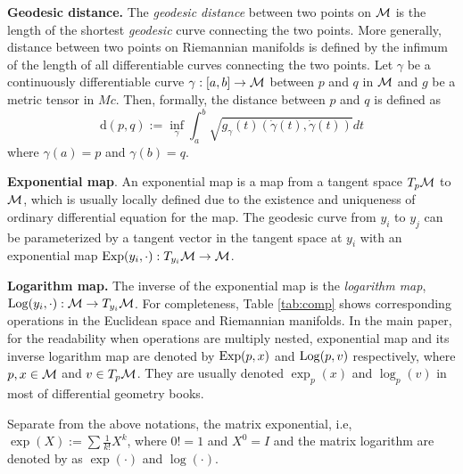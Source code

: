 \textbf{Geodesic distance.} The \textit{geodesic distance}
between two points on $\mathcal{M}$ is the length of the shortest {\em geodesic} curve connecting the two points. More generally, distance between two points on Riemannian manifolds is defined by the infimum of the length of all differentiable curves connecting the two points. Let $\gamma$ be a continuously differentiable curve $\gamma:[a,b] \rightarrow \mathcal{M}$ between $p$ and $q$ in $\mathcal{M}$ and $g$ be a metric tensor in $Mc$.
Then, formally, the distance between $p$ and $q$ is defined as
\begin{equation}
\text{d}(p,q) := \inf_\gamma \int_a^b \sqrt{g_\gamma(t) (\dot{\gamma}(t), \dot{\gamma}(t))} dt
\end{equation}
where $\gamma(a)=p$ and $\gamma(b)=q$.

\textbf{Exponential map}. An exponential map is a map from a tangent space $T_p\mathcal{M}$  to $\mathcal{M}$, which is usually locally defined due to the existence and uniqueness of ordinary differential equation for the map. The geodesic curve from $y_i$ to $y_j$ can be parameterized by a tangent vector in the tangent space at $y_i$ with an exponential map $\operatorname*{Exp}(y_i,\cdot ): T_{y_i}\mathcal{M} \rightarrow \mathcal{M}$. 


\textbf{Logarithm map.}
The inverse of the exponential map is the \textit{logarithm map}, $\operatorname*{Log}(y_i,\cdot):\mathcal{M} \rightarrow T_{y_i}\mathcal{M}$. 
For completeness, Table \ref{tab:comp} shows corresponding operations in the Euclidean space and Riemannian manifolds.
In the main paper, for the readability when operations are multiply nested, exponential map and its inverse logarithm map are denoted by $\operatorname*{Exp}(p, x)$ and $\operatorname*{Log}(p, v)$ respectively, where $p, x \in \mathcal{M}$ and $v\in T_p\mathcal{M}$. They are usually denoted $\exp_p(x)$ and $\log_p(v)$ in most of differential geometry books. 
 
Separate from the above notations, the matrix exponential, i.e, $\exp(X):= \sum \frac{1}{k!} X^k$, where $0!=1$ and $X^0=I$  and the matrix logarithm are denoted by as $\exp(\cdot)$ and $\log(\cdot)$. 


